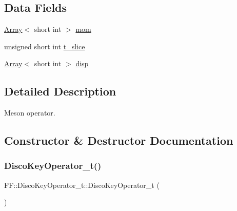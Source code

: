\subsection*{Data Fields}
\begin{DoxyCompactItemize}
\item 
\mbox{\hyperlink{classXMLArray_1_1Array}{Array}}$<$ short int $>$ \mbox{\hyperlink{structFF_1_1DiscoKeyOperator__t_a116d34044c3a792c86bf02e2097823f4}{mom}}
\item 
unsigned short int \mbox{\hyperlink{structFF_1_1DiscoKeyOperator__t_aa9e2b29ba80312c80aa53346f34ce150}{t\+\_\+slice}}
\item 
\mbox{\hyperlink{classXMLArray_1_1Array}{Array}}$<$ short int $>$ \mbox{\hyperlink{structFF_1_1DiscoKeyOperator__t_a7d29368ccd597248408ac26bf3470e4b}{disp}}
\end{DoxyCompactItemize}


\subsection{Detailed Description}
Meson operator. 

\subsection{Constructor \& Destructor Documentation}
\mbox{\label{structFF_1_1DiscoKeyOperator__t_ab4dabc722e586bb004065179dc9b4369}} 
\subsubsection{\texorpdfstring{DiscoKeyOperator\_t()}{DiscoKeyOperator\_t()}\hspace{0.1cm}{\footnotesize\ttfamily [1/3]}}
{\footnotesize\ttfamily F\+F\+::\+Disco\+Key\+Operator\+\_\+t\+::\+Disco\+Key\+Operator\+\_\+t (\begin{DoxyParamCaption}{ }\end{DoxyParamCaption})\hspace{0.3cm}{\ttfamily [inline]}}

